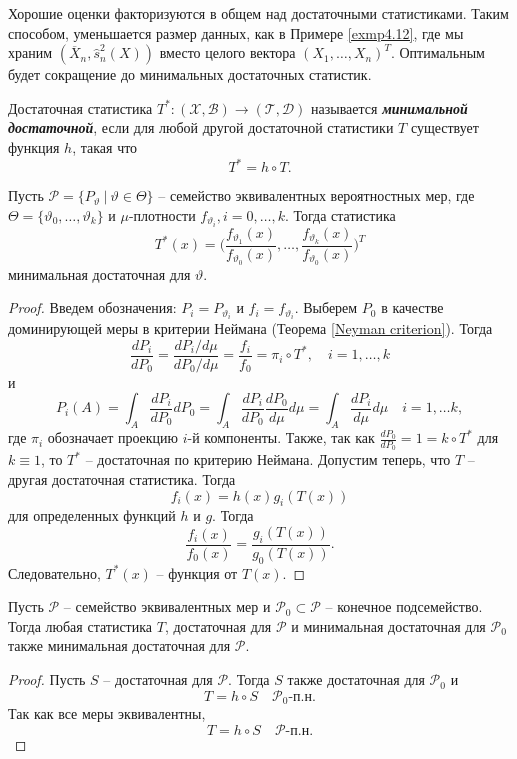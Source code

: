 \begin{rmrk}
	Хорошие оценки факторизуются в общем над достаточными статистиками. Таким способом, уменьшается размер данных, как в Примере \ref{exmp4.12}, где мы храним $(\overline{X}_n, \hat{s}_n^2(X))$ вместо целого вектора $(X_1, \dots, X_n)^T$. Оптимальным будет сокращение до минимальных достаточных статистик. 
\end{rmrk}

\begin{defn}
	Достаточная статистика $T^*\colon(\mathcal{X}, \mathcal{B}) \rightarrow (\mathcal{T}, \mathcal{D})$ называется \textbf{\textit{минимальной достаточной}}, если для любой другой достаточной статистики $T$ существует функция $h$, такая что
	\[T^*=h \circ T. \]
\end{defn}

\begin{exmp} \label{exmp4.20}
	Пусть $\mathcal{P} = \{P_\vartheta\ |\ \vartheta \in \Theta\}$ -- семейство эквивалентных вероятностных мер, где $\Theta = \{\vartheta_0, \dots, \vartheta_k\}$ и $\mu$-плотности $f_{\vartheta_i}, i = 0, \dots, k$. Тогда статистика
	\[ T^*(x) = \bigg(\frac{f_{\vartheta_1}(x)}{f_{\vartheta_0}(x)}, \dots, \frac{f_{\vartheta_k}(x)}{f_{\vartheta_0}(x)}\bigg)^T \]
	минимальная достаточная для $\vartheta$.
\end{exmp}
\begin{proof}
	Введем обозначения: $P_i = P_{\vartheta_i}$ и $f_i = f_{\vartheta_i}$. Выберем $P_0$ в качестве доминирующей меры в критерии Неймана (Теорема \ref{Neyman criterion}). Тогда
	\[ \frac{dP_i}{dP_0} = \frac{dP_i / d\mu}{dP_0 / d\mu} = \frac{f_i}{f_0} = \pi_i \circ T^*, \quad i = 1, \dots, k \]
	и
	\[ P_i(A) = \int_A \frac{dP_i}{dP_0} dP_0 = \int_A \frac{dP_i}{dP_0} \frac{dP_0}{d\mu} d\mu = \int_A \frac{dP_i}{d\mu} d\mu \quad i = 1, \dots k, \]
	где $\pi_i$ обозначает проекцию $i$-й компоненты. Также, так как $\frac{dP_0}{dP_0} = 1 = k \circ T^*$ для $k \equiv 1$, то $T^*$ -- достаточная по критерию Неймана. Допустим теперь, что $T$ -- другая достаточная статистика. Тогда
	\[ f_i(x) = h(x) g_i(T(x)) \]
	для определенных функций $h$ и $g$. Тогда
	\[\frac{f_i(x)}{f_0(x)} = \frac{g_i(T(x))}{g_0(T(x))}. \]
	Следовательно, $T^*(x)$ -- функция от $T(x)$.
\end{proof}

\begin{lmm} \label{lmm4.21}
	Пусть $\mathcal{P}$ -- семейство эквивалентных мер и $\mathcal{P}_0 \subset \mathcal{P}$ -- конечное подсемейство. Тогда любая статистика $T$, достаточная для $\mathcal{P}$ и минимальная достаточная для $\mathcal{P}_0$ также минимальная достаточная для $\mathcal{P}$.
\end{lmm}
\begin{proof}
	Пусть $S$ -- достаточная для $\mathcal{P}$. Тогда $S$ также достаточная для $\mathcal{P}_0$ и
	\[ T = h \circ S \quad \mathcal{P}_0\text{-п.н.} \]
	Так как все меры эквивалентны, 
	\[ T = h \circ S \quad \mathcal{P}\text{-п.н.} \]
\end{proof}

